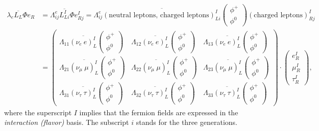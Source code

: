 \begin{equation}
\begin{split}
\lambda_e \overline{L_L} \Phi e_R &= \Lambda^e_{ij}\overline{L^I_{Li}} \Phi e^I_{Rj} = \Lambda^e_{ij}\overline{\left(\textrm{neutral leptons, charged leptons}\right)^I_{Li}} \begin{pmatrix} \phi^+ \\ \phi^0 \end{pmatrix}  \left(\textrm{charged leptons}\right)^I_{Rj} \\
&= \begin{pmatrix} 
\Lambda_{11}\overline{\left(\nu_e \ e\right)^I_L}\begin{pmatrix} \phi^+ \\ \phi^0 \end{pmatrix} &
\Lambda_{12}\overline{\left(\nu_e \ e\right)^I_L}\begin{pmatrix} \phi^+ \\ \phi^0 \end{pmatrix} &
\Lambda_{13}\overline{\left(\nu_e \ e\right)^I_L}\begin{pmatrix} \phi^+ \\ \phi^0 \end{pmatrix}\\  
\Lambda_{21}\overline{\left(\nu_\mu \ \mu\right)^I_L}\begin{pmatrix} \phi^+ \\ \phi^0 \end{pmatrix} &
\Lambda_{22}\overline{\left(\nu_\mu \ \mu\right)^I_L}\begin{pmatrix} \phi^+ \\ \phi^0 \end{pmatrix} &
\Lambda_{23}\overline{\left(\nu_\mu \ \mu\right)^I_L}\begin{pmatrix} \phi^+ \\ \phi^0 \end{pmatrix}\\
\Lambda_{31}\overline{\left(\nu_\tau \ \tau\right)^I_L}\begin{pmatrix} \phi^+ \\ \phi^0 \end{pmatrix} &
\Lambda_{32}\overline{\left(\nu_\tau \ \tau\right)^I_L}\begin{pmatrix} \phi^+ \\ \phi^0 \end{pmatrix} &
\Lambda_{33}\overline{\left(\nu_\tau \ \tau\right)^I_L}\begin{pmatrix} \phi^+ \\ \phi^0 \end{pmatrix}
\end{pmatrix}
\cdot \begin{pmatrix} e^I_R \\ \mu^I_R \\ \tau^I_R \end{pmatrix},
\end{split}
\end{equation}
where the superscript $I$ implies that the fermion fields are expressed in the \textit{interaction (flavor)} basis. The subscript $i$ stands for the three generations.

